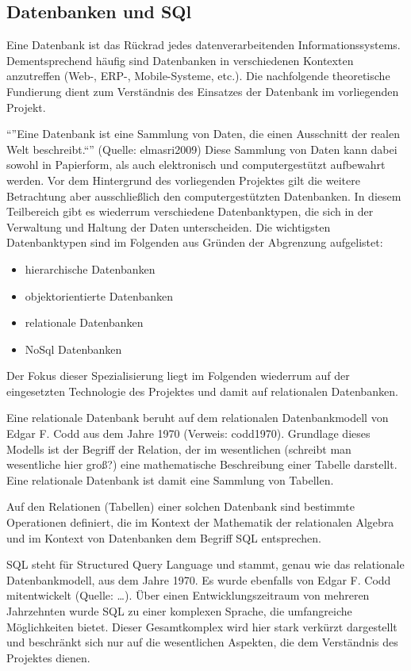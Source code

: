 \subsection{Datenbanken und SQl}
\label{sec:DatenbankenUndSql}

Eine Datenbank ist das Rückrad jedes datenverarbeitenden Informationssystems. Dementsprechend häufig sind Datenbanken in 
verschiedenen Kontexten anzutreffen (Web-, ERP-, Mobile-Systeme, etc.). Die nachfolgende theoretische Fundierung dient zum 
Verständnis des Einsatzes der Datenbank im vorliegenden Projekt.

"`"'Eine Datenbank ist eine Sammlung von Daten, die einen Ausschnitt der realen Welt beschreibt."`"' (Quelle: elmasri2009) 
Diese
Sammlung von Daten kann dabei sowohl in Papierform, als auch elektronisch und computergestützt aufbewahrt werden. Vor dem 
Hintergrund des vorliegenden Projektes gilt die weitere Betrachtung aber ausschließlich den computergestützten Datenbanken.
In diesem Teilbereich gibt es wiederrum verschiedene Datenbanktypen, die sich in der Verwaltung und Haltung der Daten 
unterscheiden. Die wichtigsten Datenbanktypen sind im Folgenden aus Gründen der Abgrenzung aufgelistet:

\begin{itemize}
  \item hierarchische Datenbanken
  \item objektorientierte Datenbanken
  \item relationale Datenbanken
  \item NoSql Datenbanken
\end{itemize}

Der Fokus dieser Spezialisierung liegt im Folgenden wiederrum auf der eingesetzten Technologie des Projektes und damit auf 
relationalen Datenbanken. 

Eine relationale Datenbank beruht auf dem relationalen Datenbankmodell von Edgar F. Codd aus dem Jahre 1970 (Verweis: 
codd1970). Grundlage dieses Modells ist der Begriff der Relation, der im wesentlichen (schreibt man wesentliche hier groß?)
eine mathematische Beschreibung einer Tabelle darstellt. Eine relationale Datenbank ist damit eine Sammlung von Tabellen.

Auf den Relationen (Tabellen) einer solchen Datenbank sind bestimmte Operationen definiert, die im Kontext der Mathematik 
der relationalen Algebra und im Kontext von Datenbanken dem Begriff SQL entsprechen.

SQL steht für Structured Query Language und stammt, genau wie das relationale Datenbankmodell, aus dem Jahre 1970. Es 
wurde ebenfalls von Edgar F. Codd mitentwickelt (Quelle: …). Über einen Entwicklungszeitraum von mehreren Jahrzehnten 
wurde SQL zu einer komplexen Sprache, die umfangreiche Möglichkeiten bietet. Dieser Gesamtkomplex wird hier stark verkürzt
dargestellt und beschränkt sich nur auf die wesentlichen Aspekten, die dem Verständnis des Projektes dienen.

